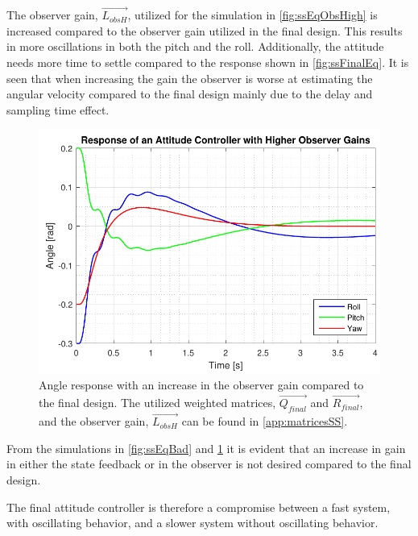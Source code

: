 The observer gain, $\vec{L_{obsH}}$, utilized for the simulation in  \autoref{fig:ssEqObsHigh} is increased compared to the observer gain utilized in the final design. This results in more oscillations in both the pitch and the roll. Additionally, the attitude needs more time to settle compared to the response shown in \autoref{fig:ssFinalEq}. It is seen that when increasing the gain the observer is worse at estimating the angular velocity compared to the final design mainly due to the delay and sampling time effect.
%
\begin{figure}[H]
	\centering
	\includegraphics[scale=0.7]{figures/ssEqObsHigh.pdf}
	\caption{Angle response with an increase in the observer gain compared to the final design. The utilized weighted matrices, $\vec{Q_{final}}$ and $\vec{R_{final}}$, and the observer gain, $\vec{L_{obsH}}$ can be found in \autoref{app:matricesSS}. }
	\label{fig:ssEqObsHigh}
\end{figure}
%
From the simulations in \autoref{fig:ssEqBad} and \ref{fig:ssEqObsHigh} it is evident that an increase in gain in either the state feedback or in the observer is not desired compared to the final design.

The final attitude controller is therefore a compromise between a fast system, with oscillating behavior, and a slower system without oscillating behavior.
\newpage